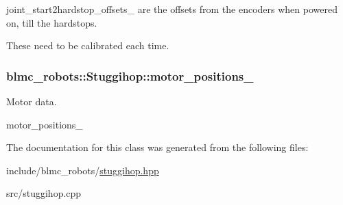 joint\+\_\+start2hardstop\+\_\+offsets\+\_\+ are the offsets from the encoders when powered on, till the hardstops. 

These need to be calibrated each time. 
\subsubsection[{\texorpdfstring{motor\+\_\+positions\+\_\+}{motor_positions_}}]{ blmc\+\_\+robots\+::\+Stuggihop\+::motor\+\_\+positions\+\_\+\hspace{0.3cm}{\ttfamily [private]}}\hypertarget{classblmc__robots_1_1Stuggihop_af452a5e831409fd2c39fd9ab7a42d9c8}{}\label{classblmc__robots_1_1Stuggihop_af452a5e831409fd2c39fd9ab7a42d9c8}


Motor data. 

motor\+\_\+positions\+\_\+ 

The documentation for this class was generated from the following files\+:\begin{DoxyCompactItemize}
\item 
include/blmc\+\_\+robots/\hyperlink{stuggihop_8hpp}{stuggihop.\+hpp}\item 
src/stuggihop.\+cpp\end{DoxyCompactItemize}
